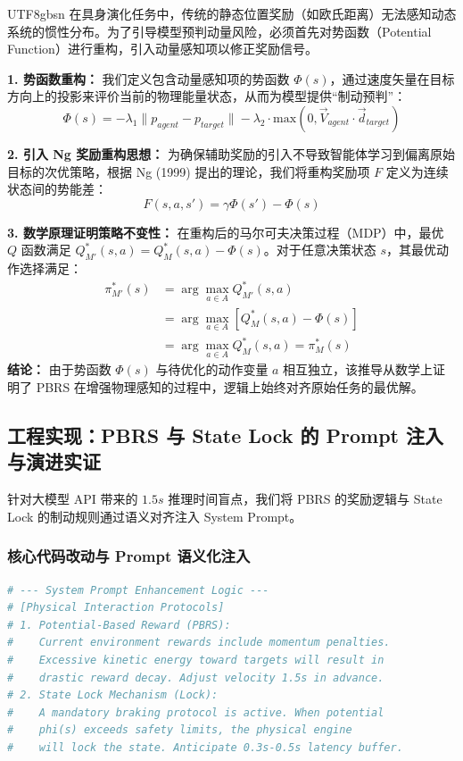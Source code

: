 \documentclass[11pt,a4paper]{article}
\begin{document}
\begin{CJK*}{UTF8}{gbsn}
在具身演化任务中，传统的静态位置奖励（如欧氏距离）无法感知动态系统的惯性分布。为了引导模型预判动量风险，必须首先对势函数（Potential Function）进行重构，引入动量感知项以修正奖励信号。

\begin{tcolorbox}[enhanced, colback=blue!5!white, colframe=SDUBlue, arc=2mm, title=\textbf{PBRS 理论推导与策略不变性证明}]
\textbf{1. 势函数重构：} 我们定义包含动量感知项的势函数 $\Phi(s)$，通过速度矢量在目标方向上的投影来评价当前的物理能量状态，从而为模型提供“制动预判”：
\begin{equation}
\Phi(s) = -\lambda_1 \|p_{agent} - p_{target}\| - \lambda_2 \cdot \text{max}(0, \vec{V}_{agent} \cdot \vec{d}_{target})
\end{equation}

\textbf{2. 引入 Ng 奖励重构思想：} 为确保辅助奖励的引入不导致智能体学习到偏离原始目标的次优策略，根据 Ng (1999) 提出的理论，我们将重构奖励项 $F$ 定义为连续状态间的势能差：
\begin{equation}
F(s, a, s') = \gamma \Phi(s') - \Phi(s)
\end{equation}

\textbf{3. 数学原理证明策略不变性：} 在重构后的马尔可夫决策过程（MDP）中，最优 $Q$ 函数满足 $Q_{M'}^*(s, a) = Q_M^*(s, a) - \Phi(s)$。对于任意决策状态 $s$，其最优动作选择满足：
\begin{align}
\pi_{M'}^*(s) &= \arg\max_{a \in A} Q_{M'}^*(s, a) \\
&= \arg\max_{a \in A} [Q_M^*(s, a) - \Phi(s)] \\
&= \arg\max_{a \in A} Q_M^*(s, a) = \pi_M^*(s)
\end{align}
\textbf{结论：} 由于势函数 $\Phi(s)$ 与待优化的动作变量 $a$ 相互独立，该推导从数学上证明了 PBRS 在增强物理感知的过程中，逻辑上始终对齐原始任务的最优解。
\end{tcolorbox}



\subsection{工程实现：PBRS 与 State Lock 的 Prompt 注入与演进实证}

针对大模型 API 带来的 $1.5s$ 推理时间盲点，我们将 PBRS 的奖励逻辑与 State Lock 的制动规则通过语义对齐注入 System Prompt。

\subsubsection{核心代码改动与 Prompt 语义化注入}
\begin{lstlisting}[language=Python, caption={PBRS与State Lock的语义注入实现}]
# --- System Prompt Enhancement Logic ---
# [Physical Interaction Protocols]
# 1. Potential-Based Reward (PBRS): 
#    Current environment rewards include momentum penalties. 
#    Excessive kinetic energy toward targets will result in 
#    drastic reward decay. Adjust velocity 1.5s in advance.
# 2. State Lock Mechanism (Lock): 
#    A mandatory braking protocol is active. When potential 
#    phi(s) exceeds safety limits, the physical engine 
#    will lock the state. Anticipate 0.3s-0.5s latency buffer.
\end{lstlisting}


\end{CJK*}
\end{document}
